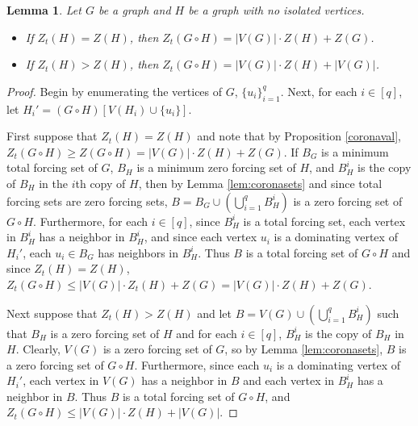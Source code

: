 \documentclass[11pt]{article}
\newtheorem{lem}[thm]{Lemma}
\theoremstyle{definition}
\newcommand{\1}{\vspace{0.1cm}}
\newcommand{\2}{\vspace{0.2cm}}
\newcommand{\3}{\vspace{0.3cm}}
\begin{document}
\begin{lem}\label{totalcoronaval}
Let $G$ be a graph and $H$ be a graph with no isolated vertices.
\begin{itemize}
\item If $Z_t(H)=Z(H)$, then $Z_t(G \circ H)=|V(G)|\cdot Z(H)+Z(G)$.
\item If $Z_t(H)>Z(H)$, then $Z_t(G \circ H)=|V(G)|\cdot Z(H)+|V(G)|$.
\end{itemize}
\end{lem}

\begin{proof}
Begin by enumerating the vertices of $G$, $\{u_i\}_{i=1}^q$.  Next, for each $i \in [q]$, let $H_i'=(G \circ H)[V(H_i) \cup \{u_i\}]$.

First suppose that $Z_t(H)=Z(H)$ and note that by Proposition \ref{coronaval}, $Z_t(G \circ H) \geq Z(G \circ H)=|V(G)| \cdot Z(H)+Z(G)$.  If $B_G$ is a minimum total forcing set of $G$, $B_H$ is a minimum zero forcing set of $H$, and $B_H^i$ is the copy of $B_H$ in the $i$th copy of $H$, then by Lemma \ref{lem:coronasets} and since total forcing sets are zero forcing sets, $B=B_G \cup (\bigcup_{i=1}^q B_H^i)$ is a zero forcing set of $G \circ H$.  Furthermore, for each $i \in [q]$, since $B_H^i$ is a total forcing set, each vertex in $B_H^i$ has a neighbor in $B_H^i$, and since each vertex $u_i$ is a dominating vertex of $H_i'$, each $u_i \in B_G$ has neighbors in $B_H^i$.  Thus $B$ is a total forcing set of $G \circ H$ and since $Z_t(H)=Z(H)$, $Z_t(G \circ H) \leq |V(G)| \cdot Z_t(H)+Z(G)=|V(G)| \cdot Z(H)+Z(G)$.

Next suppose that $Z_t(H)>Z(H)$ and let $B=V(G) \cup \left(\bigcup_{i=1}^{q}B_H^i\right)$ such that $B_H$ is a zero forcing set of $H$ and for each $i \in [q]$, $B_H^i$ is the copy of $B_H$ in $H$.  Clearly, $V(G)$ is a zero forcing set of $G$, so by Lemma \ref{lem:coronasets}, $B$ is a zero forcing set of $G \circ H$.  Furthermore, since each $u_i$ is a dominating vertex of $H_i'$, each vertex in $V(G)$ has a neighbor in $B$ and each vertex in $B_H^i$ has a neighbor in $B$.  Thus $B$ is a total forcing set of $G \circ H$, and $Z_t(G \circ H) \leq |V(G)| \cdot Z(H)+|V(G)|$.  


\end{proof}
\end{document}
